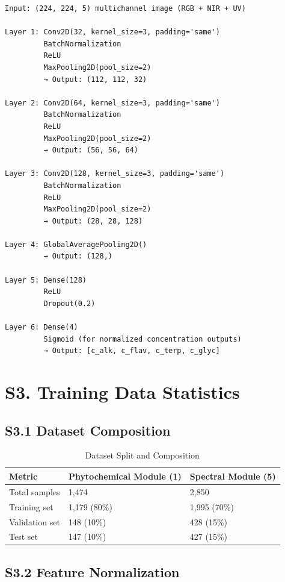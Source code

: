\documentclass[11pt,a4paper]{article}
\begin{document}
\begin{verbatim}
Input: (224, 224, 5) multichannel image (RGB + NIR + UV)

Layer 1: Conv2D(32, kernel_size=3, padding='same')
         BatchNormalization
         ReLU
         MaxPooling2D(pool_size=2)
         → Output: (112, 112, 32)

Layer 2: Conv2D(64, kernel_size=3, padding='same')
         BatchNormalization
         ReLU
         MaxPooling2D(pool_size=2)
         → Output: (56, 56, 64)

Layer 3: Conv2D(128, kernel_size=3, padding='same')
         BatchNormalization
         ReLU
         MaxPooling2D(pool_size=2)
         → Output: (28, 28, 128)

Layer 4: GlobalAveragePooling2D()
         → Output: (128,)

Layer 5: Dense(128)
         ReLU
         Dropout(0.2)

Layer 6: Dense(4)
         Sigmoid (for normalized concentration outputs)
         → Output: [c_alk, c_flav, c_terp, c_glyc]
\end{verbatim}

\section{S3. Training Data Statistics}

\subsection{S3.1 Dataset Composition}

\begin{table}[H]
\centering
\caption{Dataset Split and Composition}
\label{tab:data_stats}
\begin{tabular}{|l|l|l|}
\hline
\textbf{Metric} & \textbf{Phytochemical Module (1)} & \textbf{Spectral Module (5)} \\
\hline
Total samples & 1,474 & 2,850 \\
\hline
Training set & 1,179 (80\%) & 1,995 (70\%) \\
\hline
Validation set & 148 (10\%) & 428 (15\%) \\
\hline
Test set & 147 (10\%) & 427 (15\%) \\
\hline
\end{tabular}
\end{table}

\subsection{S3.2 Feature Normalization}
\end{document}
